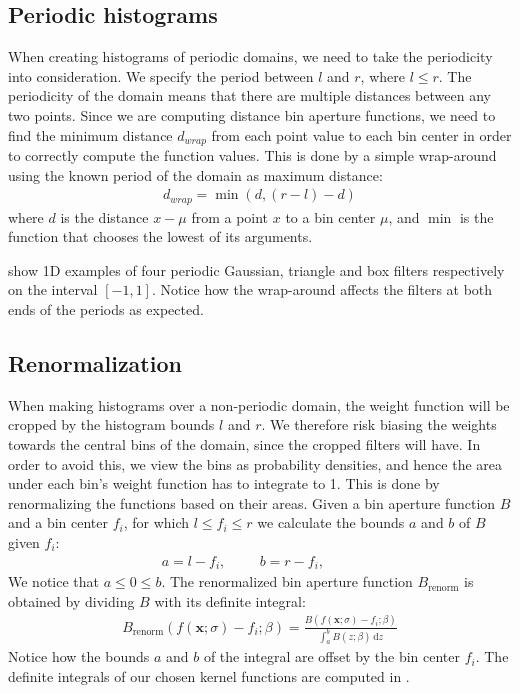 \documentclass[thesis.tex]{subfiles}
\def\x{\mathbf{x}}
\begin{document}
\subsection{Periodic histograms}
When creating histograms of periodic domains, we need to take the periodicity into consideration. We specify the period between $l$ and $r$, where $l \leq r$.
The periodicity of the domain means that there are multiple distances between any two points. Since we are computing distance bin aperture functions, we need to find the minimum distance $d_{wrap}$ from each point value to each bin center in order to correctly compute the function values. This is done by a simple wrap-around using the known period of the domain as maximum distance:
\begin{align*}
	d_{wrap} = \min(d,(r - l)-d)
\end{align*}
where $d$ is the distance $x - \mu$ from a point $x$ to a bin center $\mu$, and $\min$ is the function that chooses the lowest of its arguments.

  show 1D examples of four periodic Gaussian, triangle and box filters respectively on the interval $[-1,1]$. Notice how the wrap-around affects the filters at both ends of the periods as expected.

\subsection{Renormalization}
When making histograms over a non-periodic domain, the weight function will be cropped by the histogram bounds $l$ and $r$. We therefore risk biasing the weights towards the central bins of the domain, since the cropped filters will have. In order to avoid this, we view the bins as probability densities, and hence the area under each bin's weight function has to integrate to 1. This is done by renormalizing the functions based on their areas. Given a bin aperture function $B$ and a bin center $f_i$, for which $l \leq f_i \leq r$ we calculate the bounds $a$ and $b$ of $B$ given $f_i$:
\begin{align*}
	a = l - f_i,\hspace{1cm}
	b = r - f_i,\hspace{1cm}
\end{align*}
We notice that $a \leq 0 \leq b$. The renormalized bin aperture function $B_\text{renorm}$ is obtained by dividing $B$ with its definite integral:
\begin{align*}
	B_\text{renorm}\left( f(\x;\sigma)-f_i;\beta \right) = \frac{B \left(f(\x;\sigma)-f_i;\beta \right)}{\int_a^b B \left( z;\beta \right)\,\text{d}z}
\end{align*}
Notice how the bounds $a$ and $b$ of the integral are offset by the bin center $f_i$. The definite integrals of our chosen kernel functions are computed in .
\end{document}
